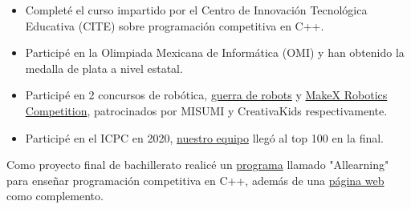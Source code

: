 \documentclass[10pt,a4paper,ragged2e,withhyper]{altacv}
\begin{document}
\begin{paracol}{2}
  \begin{itemize}
    \item Completé el curso impartido por el Centro de Innovación Tecnológica Educativa (CITE) sobre programación competitiva en C++.
    \item Participé en la Olimpiada Mexicana de Informática (OMI) y han obtenido la medalla de plata a nivel estatal.
  \end{itemize}
  \divider
  \begin{itemize}
    \item Participé en 2 concursos de robótica, {\href{https://drive.google.com/file/d/1xETjexZx_X1Bg46y_-m8kKneEbaz48dQ/view?usp=sharing}{\color{blue}guerra de robots\color{black}}} y {\href{https://drive.google.com/file/d/1QcXzJbDVQ1dSvtQrdd_j387KvKlfXH8J/view?usp=sharing}{\color{blue}MakeX Robotics Competition\color{black}}}, patrocinados por MISUMI y CreativaKids respectivamente.
  \end{itemize}
  \divider
  \begin{itemize}
    \item Participé en el ICPC en 2020, {\href{https://drive.google.com/file/d/1OwYn_YItOoTw_DI-Dajlrwc_oC57Rv6G/view?usp=sharing}{\color{blue}nuestro equipo\color{black}}} llegó al top 100 en la final.
  \end{itemize}

  \switchcolumn

  \divider

  {Como proyecto final de bachillerato realicé un {\href{https://github.com/ElKPROOB/Proyecto-Aula}{\color{blue}programa\color{black}}} llamado "Allearning" para enseñar programación competitiva en C++, además de una {\href{https://github.com/ElKPROOB/Proyecto_Aula_W}{\color{blue}página web\color{black}}} como complemento.}
  \divider


\end{paracol}
\end{document}
